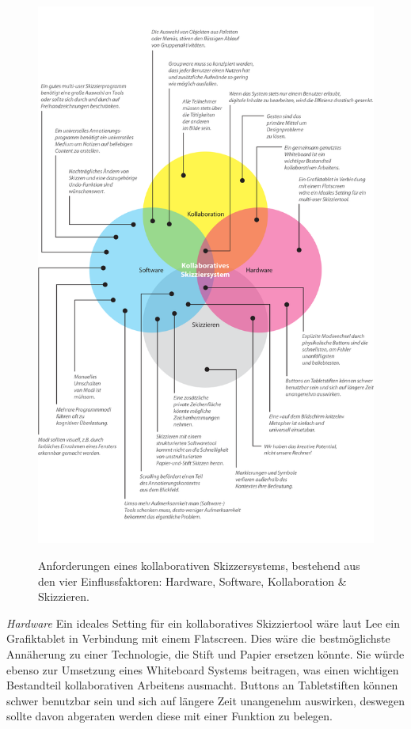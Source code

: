 \begin{figure}
	        {\includegraphics[bb=0cm 0cm 14.39cm 23.01cm]{gfx/scribblerKollaborativesSkizziersystem}}
		\caption[Anforderungen eines kollaborativen Skizzersystems]{Anforderungen eines kollaborativen Skizzersystems, bestehend aus den vier Einflussfaktoren: Hardware, Software, Kollaboration \& Skizzieren.}\label{fig:scribblerKollaborativesSkizziersystem}
\end{figure}

\medskip \emph{Hardware} Ein ideales Setting für ein kollaboratives Skizziertool wäre laut Lee ein Grafiktablet in Verbindung mit einem Flatscreen. Dies wäre die bestmöglichste Annäherung zu einer Technologie, die Stift und Papier ersetzen könnte. Sie würde ebenso zur Umsetzung eines Whiteboard Systems beitragen, was einen wichtigen Bestandteil kollaborativen Arbeitens ausmacht. Buttons an Tabletstiften können schwer benutzbar sein und sich auf längere Zeit unangenehm auswirken, deswegen sollte davon abgeraten werden diese mit einer Funktion zu belegen. 

